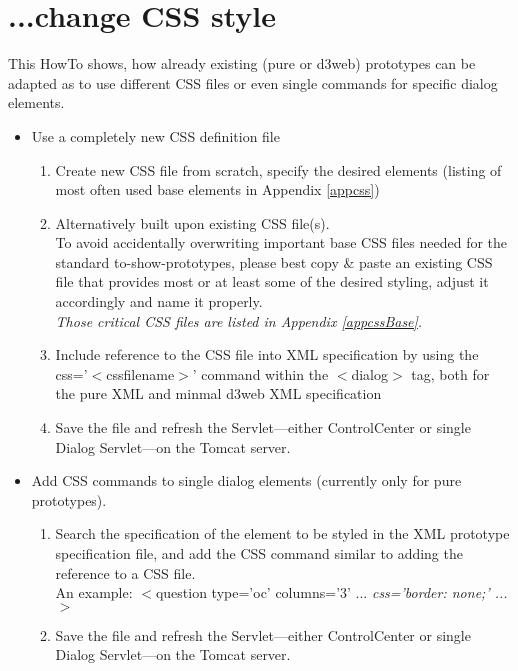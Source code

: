 \documentclass[a4paper,10pt]{scrreprt}
\begin{document}
\section{...change CSS style}\label{howtocss}
This HowTo shows, how already existing (pure or d3web) prototypes can be adapted as to use different CSS files or even single commands for specific dialog elements.

\begin{itemize}
	\item Use a completely new CSS definition file
	\begin{enumerate}
		\item Create new CSS file from scratch, specify the desired elements (listing of most often used base elements
		in Appendix \ref{appcss})
		\item Alternatively built upon existing CSS file(s). \\
		To avoid accidentally overwriting important base CSS files needed for the standard to-show-prototypes, please best copy \& paste an existing CSS file that provides most or at least some of the desired styling, adjust it 
		accordingly and name it properly. \\
		\textit{Those critical CSS files are listed in Appendix \ref{appcssBase}.}
		\item Include reference to the CSS file into XML specification by using the\\
		css='$<$cssfilename$>$' command within the $<$dialog$>$ tag, both for the pure XML and minmal d3web XML specification
		\item Save the file and refresh the Servlet---either ControlCenter or single Dialog Servlet---on
		the Tomcat server.
	\end{enumerate}
	\item Add CSS commands to single dialog elements (currently only for pure prototypes). 
	\begin{enumerate}
		\item Search the specification of the element to be styled in the XML prototype specification file, and add 
		the CSS command similar to adding the reference to a CSS file. \\
		An example: $<$question type='oc' columns='3' ... \textit{css='border: none;' ... $>$}
		\item Save the file and refresh the Servlet---either ControlCenter or single Dialog Servlet---on
		the Tomcat server.
	\end{enumerate}
\end{itemize} 
\end{document}
